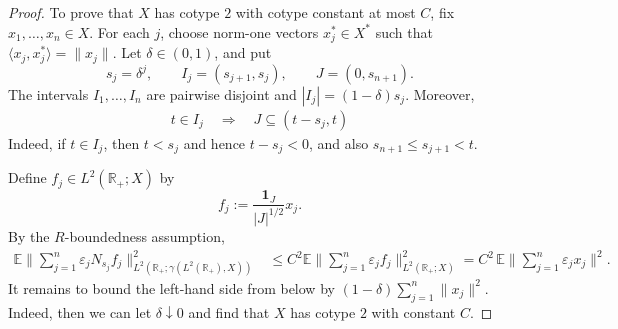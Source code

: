 \documentclass{amsart}
\let\le\leqslant
\let\leq\leqslant
\theoremstyle{plain}
\theoremstyle{remark}
\theoremstyle{plain}
\numberwithin{equation}{section}
\newcommand{\R}{\mathbb R}
\newcommand{\E}{\mathbb E}
\newcommand{\1}{\mathbf 1}
\newcommand{\dd}{\,{\rm d}}
\begin{document}
\begin{proof}

To prove that $X$ has cotype $2$ with cotype constant at most $C$, fix $x_1,\ldots,x_n\in X$. For each $j$, choose norm-one vectors $x_j^*\in X^*$ such that $\langle x_j,x_j^*\rangle=\|x_j\|$.
Let $\delta\in(0,1)$, and put \[
s_j=\delta^j,\qquad
I_j=(s_{j+1},s_j),\qquad
J=(0,s_{n+1}).
\]
The intervals $I_1,\ldots,I_n$ are pairwise disjoint and $|I_j| = (1-\delta)s_j$. Moreover,
\begin{align*}
t\in I_j\quad  \Longrightarrow \quad J\subseteq(t-s_j,t)
\end{align*}
Indeed, if $t\in I_j$, then $t<s_j$ and hence $t-s_j<0$, and also $s_{n+1}\le s_{j+1} < t$.

Define $f_j\in L^2(\R_+;X)$ by
\[f_j:=\frac{\1_J}{|J|^{1/2}} x_j.\]
By the $R$-boundedness assumption,
\begin{align*}
\E
\Big\|
\sum_{j=1}^n \varepsilon_jN_{s_j}f_j
\Big\|_{L^2(\R_+;\gamma(L^2(\R_+),X))}^2
&\le
C^2
\E
\Big\|
\sum_{j=1}^n \varepsilon_jf_j
\Big\|_{L^2(\R_+;X)}^2
=
C^2 \,
\E
\Big\|
\sum_{j=1}^n \varepsilon_jx_j
\Big\|^2.
\end{align*}
It remains to bound the left-hand side from below by $(1-\delta)\sum_{j=1}^n \|x_j\|^2$. Indeed, then we can let $\delta\downarrow 0$ and find that $X$ has cotype $2$ with constant $C$.


\end{proof}
\end{document}
